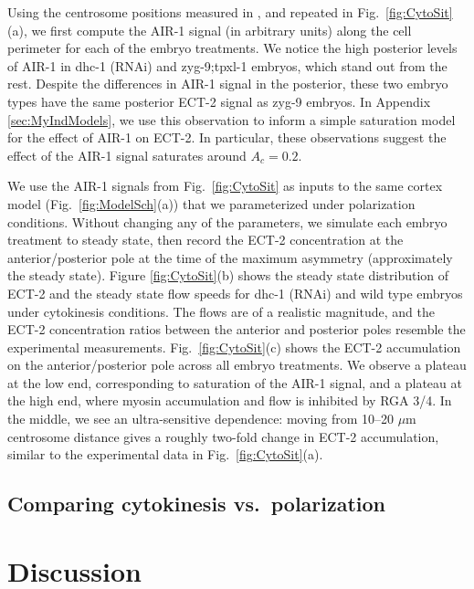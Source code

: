 \documentclass[11pt]{article}
\begin{document}
Using the centrosome positions measured in \citep{longhini2022aurora}, and repeated in Fig.\ \ref{fig:CytoSit}(a), we first compute the AIR-1 signal (in arbitrary units) along the cell perimeter for each of the embryo treatments. We notice the high posterior levels of AIR-1 in dhc-1 (RNAi) and zyg-9;tpxl-1 embryos, which stand out from the rest. Despite the differences in AIR-1 signal in the posterior, these two embryo types have the same posterior ECT-2 signal as zyg-9 embryos. In Appendix \ref{sec:MyIndModels}, we use this observation to inform a simple saturation model for the effect of AIR-1 on ECT-2. In particular, these observations suggest the effect of the AIR-1 signal saturates around $A_c=0.2$. 

We use the AIR-1 signals from Fig.\ \ref{fig:CytoSit} as inputs to the same cortex model (Fig.\ \ref{fig:ModelSch}(a)) that we parameterized under polarization conditions. Without changing any of the parameters, we simulate each embryo treatment to steady state, then record the ECT-2 concentration at the anterior/posterior pole at the time of the maximum asymmetry (approximately the steady state). Figure \ref{fig:CytoSit}(b) shows the steady state distribution of ECT-2 and the steady state flow speeds for dhc-1 (RNAi) and wild type embryos under cytokinesis conditions. The flows are of a realistic magnitude, and the ECT-2 concentration ratios between the anterior and posterior poles resemble the experimental measurements. Fig.\ \ref{fig:CytoSit}(c) shows the ECT-2 accumulation on the anterior/posterior pole across all embryo treatments. We observe a plateau at the low end, corresponding to saturation of the AIR-1 signal, and a plateau at the high end, where myosin accumulation and flow is inhibited by RGA 3/4. In the middle, we see an ultra-sensitive dependence: moving from 10--20 $\mu$m centrosome distance gives a roughly two-fold change in ECT-2 accumulation, similar to the experimental data in Fig.\ \ref{fig:CytoSit}(a). 

\subsection{Comparing cytokinesis vs.\ polarization}

\section{Discussion}
\end{document}

